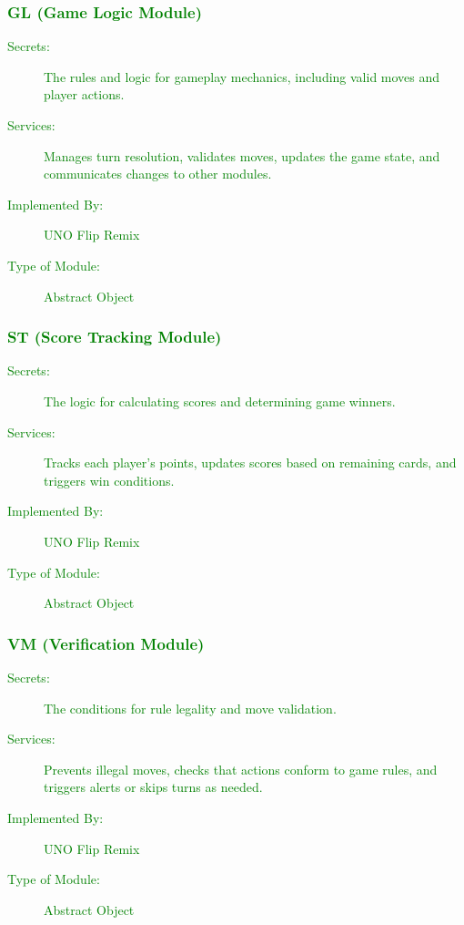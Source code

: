 \documentclass[12pt, titlepage]{article}
\newcommand{\added}[1]{\textcolor{green}{#1}}
\begin{document}
\added{
\subsubsection{GL (Game Logic Module)} \label{mGL}

\begin{description}
\item[Secrets:] The rules and logic for gameplay mechanics, including valid moves and player actions.
\item[Services:] Manages turn resolution, validates moves, updates the game state, and communicates changes to other modules.
\item[Implemented By:] UNO Flip Remix
\item[Type of Module:] Abstract Object
\end{description}
}

\added{
\subsubsection{ST (Score Tracking Module)} \label{mScore}

\begin{description}
\item[Secrets:] The logic for calculating scores and determining game winners.
\item[Services:] Tracks each player's points, updates scores based on remaining cards, and triggers win conditions.
\item[Implemented By:] UNO Flip Remix
\item[Type of Module:] Abstract Object
\end{description}
}

\added{
\subsubsection{VM (Verification Module)} \label{mVerification}

\begin{description}
\item[Secrets:] The conditions for rule legality and move validation.
\item[Services:] Prevents illegal moves, checks that actions conform to game rules, and triggers alerts or skips turns as needed.
\item[Implemented By:] UNO Flip Remix
\item[Type of Module:] Abstract Object
\end{description}
}
\end{document}
